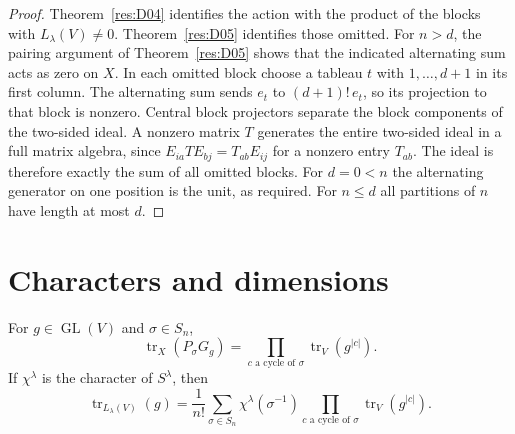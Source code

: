 \begin{proof}
Theorem~\ref{res:D04} identifies the action with the product of
the blocks with \(L_\lambda(V)\ne0\). Theorem~\ref{res:D05}
identifies those omitted. For \(n>d\), the pairing argument
of Theorem~\ref{res:D05} shows that the indicated alternating
sum acts as zero on \(X\). In each omitted block choose a
tableau \(t\) with \(1,\ldots,d+1\) in its first column.
The alternating sum sends \(e_t\) to \((d+1)!\,e_t\), so its
projection to that block is nonzero. Central block projectors
separate the block components of the two-sided ideal.
A nonzero matrix \(T\) generates the entire two-sided ideal in a
full matrix algebra, since \(E_{ia}TE_{bj}=T_{ab}E_{ij}\) for
a nonzero entry \(T_{ab}\). The ideal is therefore exactly
the sum of all omitted blocks. For \(d=0<n\) the alternating
generator on one position is the unit, as required.
For \(n\leq d\) all partitions of \(n\) have length at most \(d\).
\end{proof}

\section{Characters and dimensions}

\begin{proposition}
\label{res:D07}
For \(g\in\operatorname{GL}(V)\) and \(\sigma\in S_n\),
\[
 \operatorname{tr}_X(P_\sigma G_g)
       =\prod_{c\text{ a cycle of }\sigma}
                   \operatorname{tr}_V(g^{|c|}).
\]
If \(\chi^\lambda\) is the character of \(S^\lambda\), then
\begin{equation}
\label{eq:schur-weyl-trace-average}
 \operatorname{tr}_{L_\lambda(V)}(g)
 =\frac{1}{n!}\sum_{\sigma\in S_n}
     \chi^\lambda(\sigma^{-1})
     \prod_{c\text{ a cycle of }\sigma}\operatorname{tr}_V(g^{|c|}).
\end{equation}
\end{proposition}


